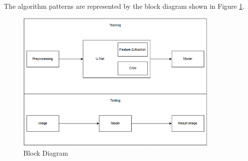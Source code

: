 The algorithm patterns are represented by the block diagram shown in Figure \ref{block}.

\begin{figure}[htp]
    \centering
    \includegraphics[width=10cm]{projectChapters/images/blok_diyagram.png}
    \caption{Block Diagram}
    \label{block}
\end{figure}
